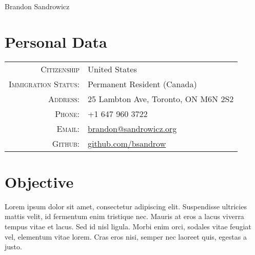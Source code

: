 \documentclass[a4paper,10pt]{article}
\begin{document}
\pagestyle{empty} %

\par{\centering
    {\Huge Brandon Sandrowicz }
    \bigskip\par}

\section{Personal Data}
\begin{tabular}{rl}
\textsc{Citizenship}                    & United States\\
\textsc{Immigration Status:}            & Permanent Resident (Canada)\\
\textsc{Address:}                       & 25 Lambton Ave, Toronto, ON M6N 2S2\\
\textsc{Phone:}                         & +1 647 960 3722\\
\textsc{Email:}                         & \href{mailto:brandon@sandrowicz.org}{brandon@sandrowicz.org}\\
\textsc{Github:}                        & \href{http://github.com/bsandrow}{github.com/bsandrow}\\
\end{tabular}

\section{Objective}
Lorem ipsum dolor sit amet, consectetur adipiscing elit. Suspendisse ultricies
mattis velit, id fermentum enim tristique nec. Mauris at eros a lacus viverra
tempus vitae et lacus. Sed id nisl ligula. Morbi enim orci, sodales vitae
feugiat vel, elementum vitae lorem. Cras eros nisi, semper nec laoreet quis,
egestas a justo.

\end{document}
